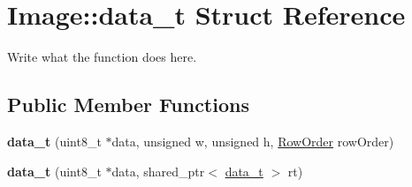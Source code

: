 \hypertarget{structImage_1_1data__t}{\section{Image\+:\+:data\+\_\+t Struct Reference}
\label{structImage_1_1data__t}
}


Write what the function does here.  


\subsection*{Public Member Functions}
\begin{DoxyCompactItemize}
\item 
\hypertarget{structImage_1_1data__t_ab3f0a7f8143399394e84c9c18e9b1619}{{\bfseries data\+\_\+t} (uint8\+\_\+t $\ast$data, unsigned w, unsigned h, \hyperlink{classImage_a856d0983e089ff127d0bcad3828c1aab}{Row\+Order} row\+Order)}\label{structImage_1_1data__t_ab3f0a7f8143399394e84c9c18e9b1619}

\item 
\hypertarget{structImage_1_1data__t_abedf51072a0d2354bd931200e8059b6f}{{\bfseries data\+\_\+t} (uint8\+\_\+t $\ast$data, shared\+\_\+ptr$<$ \hyperlink{structImage_1_1data__t}{data\+\_\+t} $>$ rt)}\label{structImage_1_1data__t_abedf51072a0d2354bd931200e8059b6f}

\end{DoxyCompactItemize}
